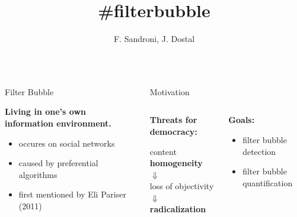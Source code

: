 \documentclass{beamer}
\title{\#filterbubble}
\author[dostal.jakub@outlook.com]{F. Sandroni, J. Dostal}
\begin{document}
\begin{frame}[fragile]
\begin{columns}[T]
\begin{column}{.33\textwidth}

\begin{block}{Filter Bubble}
    \center
    \begin{large}\textbf{Living in one's own information environment.}\end{large}
    \vspace{0.8cm}
    \begin{itemize}
        \item occures on social networks
        \item caused by preferential algorithms
        \item first mentioned by Eli Pariser (2011)
    \end{itemize}
\end{block}

\end{column}
\begin{column}{.63\textwidth}
    \begin{customalertblock}{Motivation}
        \begin{columns}
            \begin{column}{.5\textwidth}
                \begin{large}\textbf{Threats for democracy:}\end{large}
                \vspace{0.5cm}
                \center
                content \textbf{homogeneity}\\
                $\Downarrow$\\
                loss of objectivity\\
                $\Downarrow$\\
                \textbf{radicalization}
            \end{column}
            \begin{column}{.5\textwidth}
                \begin{large}\textbf{Goals:}\end{large}
                \vspace{0.5cm}
                \begin{itemize}
                    \item filter bubble detection
                    \item filter bubble quantification
                \end{itemize}
            \end{column}
        \end{columns}
    \end{customalertblock}


\end{column}
\end{columns}
\end{frame}
\end{document}
